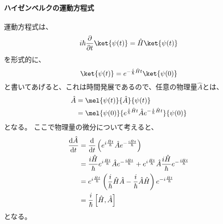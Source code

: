 \documentclass[titlepage]{ltjsarticle}
\begin{document}
\paragraph{ハイゼンベルクの運動方程式}
運動方程式は、
\begin{equation}
  i \hbar \pdv{}{t} \ket{\psi(t)} = \hat{H}\ket{\psi(t)}
\end{equation}
を形式的に、
\begin{equation}
  \ket{\psi(t)} = e^{-\frac{i}{\hbar}\hat{H}t}\ket{\psi(0)}
\end{equation}
と書いてあげると、これは時間発展であるので、任意の物理量\(\hat{A}\)とは、
\begin{align}
  \hat{A} & = \mel{\psi(t)}{\hat{A}}{\psi(t)} \\
  & = \mel{\psi(0)}{e^{\frac{i}{\hbar}\hat{H}t}\hat{A}e^{-\frac{i}{\hbar}\hat{H}t}}{\psi(0)} \\
\end{align}
となる。
ここで物理量の微分について考えると、
\begin{align}
  \odv{\hat{A}}{t} & = \odv{}{t} \left( e^{i \frac{\hat{H}t}{\hbar}} \hat{A} e^{-\frac{i \hat{H}t}{\hbar}} \right)\\
  & = \frac{i \hat{H}}{\hbar} e^{i \frac{\hat{H}t}{\hbar}} \hat{A} e^{-\frac{i \hat{H}t}{\hbar}} + e^{i \frac{\hat{H}t}{\hbar}} \hat{A} \frac{i \hat{H}}{\hbar} e^{-\frac{i \hat{H}t}{\hbar}}\\
  & = e^{i \frac{\hat{H}t}{\hbar}}\left( \frac{i}{\hbar}\hat{H}\hat{A} - \frac{i}{\hbar} \hat{A} \hat{H} \right)e^{-i \frac{\hat{H}t}{\hbar}}\\
  & = \frac{i }{\hbar}\left[ \hat{H}, \hat{A} \right]
\end{align}
となる。
\end{document}
